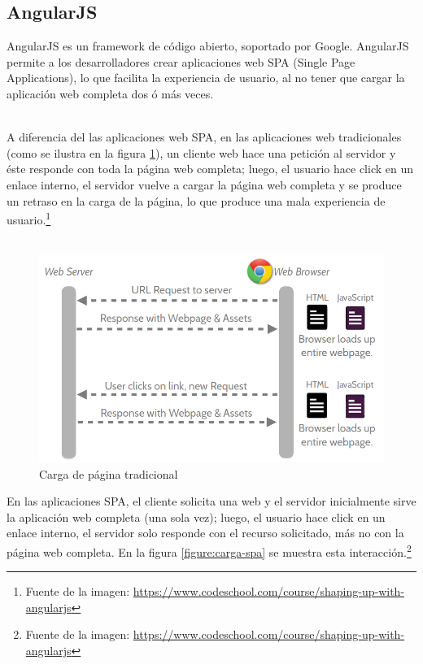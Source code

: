 	
	\subsection{AngularJS}
		AngularJS es un framework de código abierto, soportado por Google. AngularJS
		permite a los desarrolladores crear aplicaciones web SPA (Single Page Applications), lo
		que facilita la experiencia de usuario, al no tener que cargar la
		aplicación web completa dos ó más veces.\\\
		
		A diferencia del las aplicaciones web SPA, en las aplicaciones
		web tradicionales (como se ilustra en la figura
		\ref{figure:carga-tradicional}), un cliente web hace una petición al servidor
		y éste responde con toda la página web completa; luego, el usuario hace click
		en un enlace interno, el servidor vuelve a cargar la página web completa
		y se produce un retraso en la carga de la página, lo que produce una mala
		experiencia de usuario.\footnote{Fuente de la imagen:
		\href{https://www.codeschool.com/course/shaping-up-with-angularjs}
		{https://www.codeschool.com/course/shaping-up-with-angularjs}} \\\
		
		\begin{figure}[H]
		    \centering
			\includegraphics[width=18cm]{../imgs/ejemplos/1.png}
			\caption{Carga de página tradicional}
			\label{figure:carga-tradicional}
		\end{figure}
		
		
		En las aplicaciones SPA, el cliente solicita una web y el servidor
		inicialmente sirve la aplicación web completa (una sola vez); luego, el
		usuario hace click en un enlace interno, el servidor solo responde con el recurso
		solicitado, más no con la página web completa. En la figura
		\ref{figure:carga-spa} se muestra esta interacción.\footnote{Fuente de la imagen: 
		\href{https://www.codeschool.com/course/shaping-up-with-angularjs}
		{https://www.codeschool.com/course/shaping-up-with-angularjs}}
		
